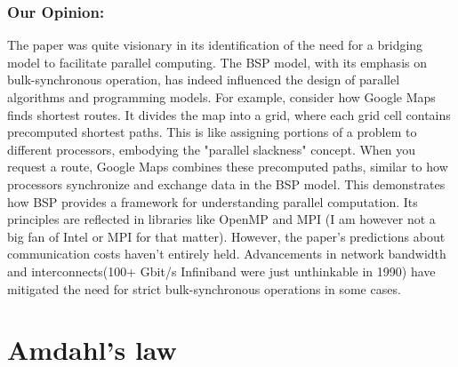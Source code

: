 \documentclass[12pt]{article}
\begin{document}
 \subsubsection{Our Opinion:}
 The paper was quite visionary in its identification of the need for a bridging model to facilitate parallel computing. The BSP model, with its emphasis on bulk-synchronous operation, has indeed influenced the design of parallel algorithms and programming models. For example, consider how Google Maps finds shortest routes. It divides the map into a grid, where each grid cell contains precomputed shortest paths. This is like assigning portions of a problem to different processors, embodying the "parallel slackness" concept. When you request a route, Google Maps combines these precomputed paths, similar to how processors synchronize and exchange data in the BSP model. This demonstrates how BSP provides a framework for understanding parallel computation. Its principles are reflected in libraries like OpenMP and MPI (I am however not a big fan of Intel or MPI for that matter). However, the paper's predictions about communication costs haven't entirely held. Advancements in network bandwidth and interconnects(100+ Gbit/s Infiniband were just unthinkable in 1990) have mitigated the need for strict bulk-synchronous operations in some cases.

\section{Amdahl's law}
\end{document}

